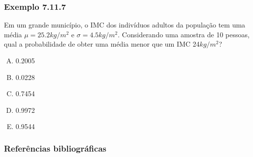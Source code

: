 \documentclass[11pt]{beamer}
\begin{document}
\begin{frame}
\frametitle{Exemplo 7.11.7}
Em um grande município, o IMC dos indivíduos adultos da população tem uma média \(\mu=25.2kg/m^2\) e \(\sigma=4.5kg/m^2\). Considerando uma amostra de 10 pessoas, qual a probabilidade de obter uma média menor que um IMC 24\(kg/m^2\)?
\begin{enumerate}[A)]
\item 0.2005
\item 0.0228
\item 0.7454
\item 0.9972
\item 0.9544
\end{enumerate}

\end{frame}


\begin{frame}
\frametitle{Referências bibliográficas}
\printbibliography
\end{frame}
\end{document}
